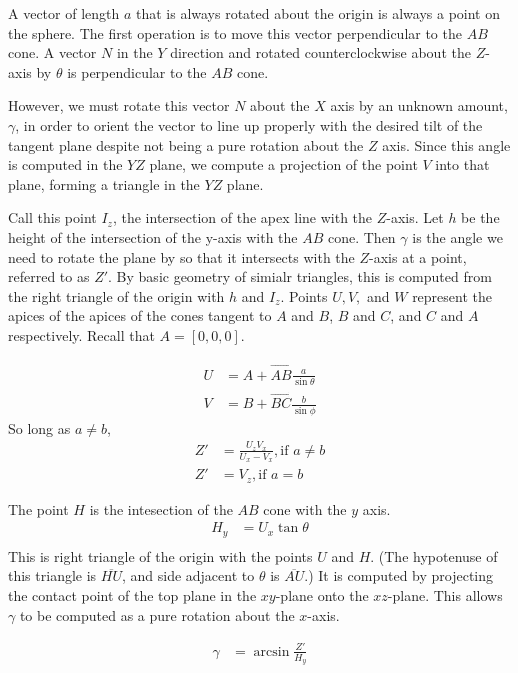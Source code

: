 \documentclass{article}
\begin{document}
A vector of length $a$ that is always rotated about the origin is always a point on the sphere.
The first operation is to move this vector perpendicular to the $AB$ cone.
A vector $N$ in the $Y$ direction and rotated counterclockwise
about the $Z$-axis by $\theta$ is perpendicular to the $AB$ cone.

However, we must rotate this vector $N$ about the $X$ axis by an unknown amount, $\gamma$, in order
to orient the vector to line up properly with the
desired tilt of the tangent plane despite not being a pure rotation about the $Z$ axis.
Since this angle is computed in the $YZ$ plane, we compute a projection of the point $V$ into
that plane, forming a triangle in the $YZ$ plane.

Call this point $I_z$, the intersection
of the apex line with the $Z$-axis. Let $h$ be the height of the intersection of the y-axis with the $AB$ cone.
Then $\gamma$ is the angle we need to rotate the plane by so that it intersects with the
$Z$-axis at a point, referred to as $Z'$.
By basic geometry of simialr triangles, this is computed from the right triangle of the origin with $h$ and $I_z$.
Points $U, V, $ and $W$ represent the apices of the apices of the cones tangent to $A$ and $B$, $B$ and $C$,
and $C$ and $A$ respectively. Recall that $A = [0,0,0]$.

\begin{align}
  U &= A + \overrightarrow{AB} \frac{a}{\sin{\theta}} \\
  V &= B + \overrightarrow{BC} \frac{b}{\sin{\phi}}
\end{align}
So long as $a \neq b$,
\begin{align}
  Z' &= \frac{U_z V_x}{U_x - V_x}, \text{if  $a \neq b$} \label{eq:zprime} \\
  Z' &= V_z, \text{if $a = b$}
\end{align}

The point $H$ is the intesection of the $AB$ cone with the $y$ axis.
\begin{align}
  H_y &= U_x \tan{\theta} \\
\end{align}
This is right triangle of the origin with the points $U$ and $H$. (The hypotenuse
of this triangle is $\overline{HU}$, and side adjacent to $\theta$ is $\overline{AU}$.)
It is computed by projecting the contact point of the top plane in the $xy$-plane
onto the $xz$-plane. This allows $\gamma$ to be computed as a pure rotation
about the $x$-axis.

\begin{align}
  \gamma &= \arcsin{\frac{Z'}{H_y}} \label{eq:gamma}
\end{align}
\end{document}
